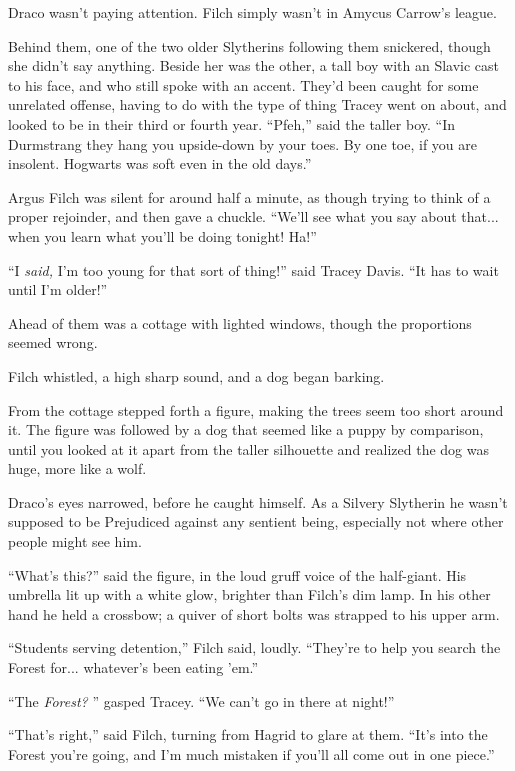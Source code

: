 Draco wasn't paying attention. Filch simply wasn't in Amycus Carrow's
league.

Behind them, one of the two older Slytherins following them snickered,
though she didn't say anything. Beside her was the other, a tall boy
with an Slavic cast to his face, and who still spoke with an accent.
They'd been caught for some unrelated offense, having to do with the
type of thing Tracey went on about, and looked to be in their third or
fourth year. ``Pfeh,'' said the taller boy. ``In Durmstrang they hang
you upside-down by your toes. By one toe, if you are insolent. Hogwarts
was soft even in the old days.''

Argus Filch was silent for around half a minute, as though trying to
think of a proper rejoinder, and then gave a chuckle. ``We'll see what
you say about that... when you learn what you'll be doing tonight!
Ha!''

``I \emph{said,} I'm too young for that sort of thing!'' said Tracey
Davis. ``It has to wait until I'm older!''

Ahead of them was a cottage with lighted windows, though the proportions
seemed wrong.

Filch whistled, a high sharp sound, and a dog began barking.

From the cottage stepped forth a figure, making the trees seem too short
around it. The figure was followed by a dog that seemed like a puppy by
comparison, until you looked at it apart from the taller silhouette and
realized the dog was huge, more like a wolf.

Draco's eyes narrowed, before he caught himself. As a Silvery Slytherin
he wasn't supposed to be Prejudiced against any sentient being,
especially not where other people might see him.

``What's this?'' said the figure, in the loud gruff voice of the
half-giant. His umbrella lit up with a white glow, brighter than Filch's
dim lamp. In his other hand he held a crossbow; a quiver of short bolts
was strapped to his upper arm.

``Students serving detention,'' Filch said, loudly. ``They're to help
you search the Forest for... whatever's been eating 'em.''

``The \emph{Forest?} '' gasped Tracey. ``We can't go in there at night!''

``That's right,'' said Filch, turning from Hagrid to glare at them.
``It's into the Forest you're going, and I'm much mistaken if you'll all
come out in one piece.''

